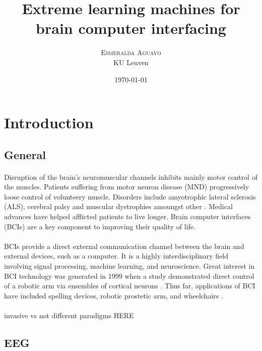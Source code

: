 \documentclass[twoside]{article}
\title{Extreme learning machines for brain computer interfacing} %
\author{%
\textsc{Esmeralda Aguayo} \\[1ex] %
\normalsize KU Leuven \\ %
}
\date{\today} %
\begin{document}
\maketitle


\section{Introduction}
\subsection{General}
\paragraph{}
Disruption of the brain's neuromuscular channels inhibits mainly motor control of the muscles. Patients suffering from motor neuron disease (MND) progressively loose control of volunteery muscle. Disorders include amyotrophic lateral sclerosis (ALS), cerebral palsy and muscular dystrophies amoungst other \citep{wolpaw2002brain}. Medical advances have helped afflicted patients to live longer. Brain computer interfaces (BCIs) are a key component to improving their quality of life.

\paragraph{}
BCIs provide a direct external communication channel between the brain and external devices, such as a computer. It is a highly interdisciplinary field involving signal processing, machine learning, and neuroscience. Great interest in BCI technology was generated in 1999 when a study demonstrated direct control of a robotic arm via ensembles of cortical neurons \citep{chapin1999real}.  Thus far, applications of BCI have included spelling devices, robotic prostetic arm, and wheelchairs \citep{rezeika2018brain, chapin1999real, lauer2000applications}.

\paragraph{}
invasive vs not
different paradigms
HERE




\subsection{EEG}
\end{document}
